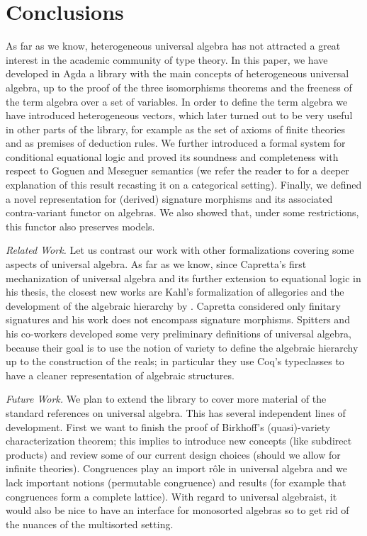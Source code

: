 \section{Conclusions}
\label{sec:conclusions}

As far as we know, heterogeneous universal algebra has not attracted a
great interest in the academic community of type theory. In this
paper, we have developed in Agda a library with the main concepts of
heterogeneous universal algebra, up to the proof of the three
isomorphisms theorems and the freeness of the term algebra over a set
of variables. In order to define the term algebra we have introduced
heterogeneous vectors, which later turned out to be very useful in
other parts of the library, for example as the set of axioms of finite
theories and as premises of deduction rules. We further introduced a
formal system for conditional equational logic and proved its
soundness and completeness with respect to Goguen and Meseguer
semantics (we refer the reader to \cite{vidal-06} for a deeper
explanation of this result recasting it on a categorical
setting). Finally, we defined a novel representation for (derived)
signature morphisms and its associated contra-variant functor on
algebras. We also showed that, under some restrictions, this functor
also preserves models.

\textit{Related Work.} Let us contrast our work with other
formalizations covering some aspects of universal algebra. As far as
we know, since Capretta's \citeyearpar{capretta-99} first mechanization of
universal algebra and its further extension to equational logic in his
thesis, the closest new works are Kahl's \citeyearpar{kahl-2011}
formalization of allegories and the development of the algebraic
hierarchy by \cite{spitters-algebraic-11}. Capretta
considered only finitary signatures and his work does not encompass
signature morphisms. Spitters and his co-workers developed some very
preliminary definitions of universal algebra, because their goal is to
use the notion of variety to define the algebraic hierarchy up to the
construction of the reals; in particular they use Coq's typeclasses to
have a cleaner representation of algebraic structures.


\textit{Future Work.} We plan to extend the library to cover more
material of the standard references on universal algebra. This has
several independent lines of development. First we want to finish the
proof of Birkhoff's (quasi)-variety characterization theorem; this
implies to introduce new concepts (like subdirect products) and review
some of our current design choices (should we allow for infinite
theories). Congruences play an import rôle in universal algebra and we
lack important notions (permutable congruence) and results (for
example that congruences form a complete lattice). With regard to
universal algebraist, it would also be nice to have an interface for
monosorted algebras so to get rid of the nuances of the multisorted
setting.

